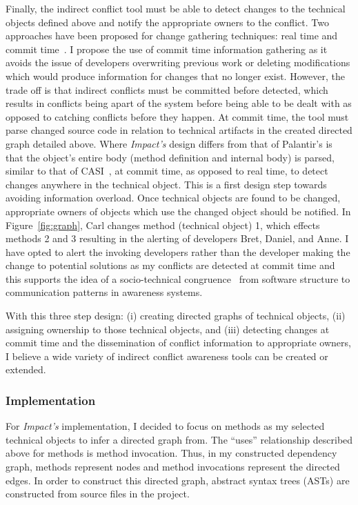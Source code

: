 Finally, the indirect conflict tool must be able to detect changes
to the technical objects defined above and notify the appropriate owners
to the conflict. 
Two approaches have been 
proposed for change gathering techniques: real time and commit 
time~\cite{Fitzpatrick:2002:SPA}.
I propose the use of commit time
information gathering as it avoids the issue of developers 
overwriting previous work or deleting modifications which would 
produce information for changes that no longer exist. However, the
trade off is that indirect conflicts must be committed before detected,
which results in conflicts being apart of the system before being able
to be dealt with as opposed to catching conflicts before they happen.
At commit time, the tool must parse changed source code in relation
to technical artifacts in the created directed graph detailed above.
Where \textit{Impact's} design differs from that of Palantir's is that
the object's entire body (method definition and internal body) is 
parsed, similar to that of CASI~\cite{Servant:2010:CPI},
at commit time, as opposed to real time, to detect changes anywhere in the technical object.
This is a first design step towards avoiding information overload.
Once technical objects are found to be changed, appropriate owners
of objects which use the changed object should be notified. 
In Figure~\ref{fig:graph}, Carl changes method (technical object) 1,
which effects methods 2 and 3 resulting in the alerting of
developers Bret, Daniel, and Anne. I have opted to alert the invoking
developers rather than the developer making the change to potential
solutions as my conflicts are detected at commit time and this supports
the idea of a socio-technical congruence~\cite{Kwan:2011:ESC} 
from software structure to communication patterns in awareness systems.

With this three step design: (i) creating directed graphs of technical
objects, (ii) assigning ownership to those technical objects, and (iii)
detecting changes at commit time and the dissemination of conflict information
to appropriate owners, I believe a wide variety of
indirect conflict awareness tools can be created or extended.

\subsubsection{Implementation}
For \textit{Impact's} implementation, I decided to focus on methods as my
selected technical objects to infer a directed graph from. The ``uses'' 
relationship described above for methods is method invocation.
Thus, in my constructed dependency graph, methods represent nodes
and method invocations represent the directed edges. In order to 
construct this directed graph, abstract syntax trees (ASTs) are 
constructed from source files in the project.


